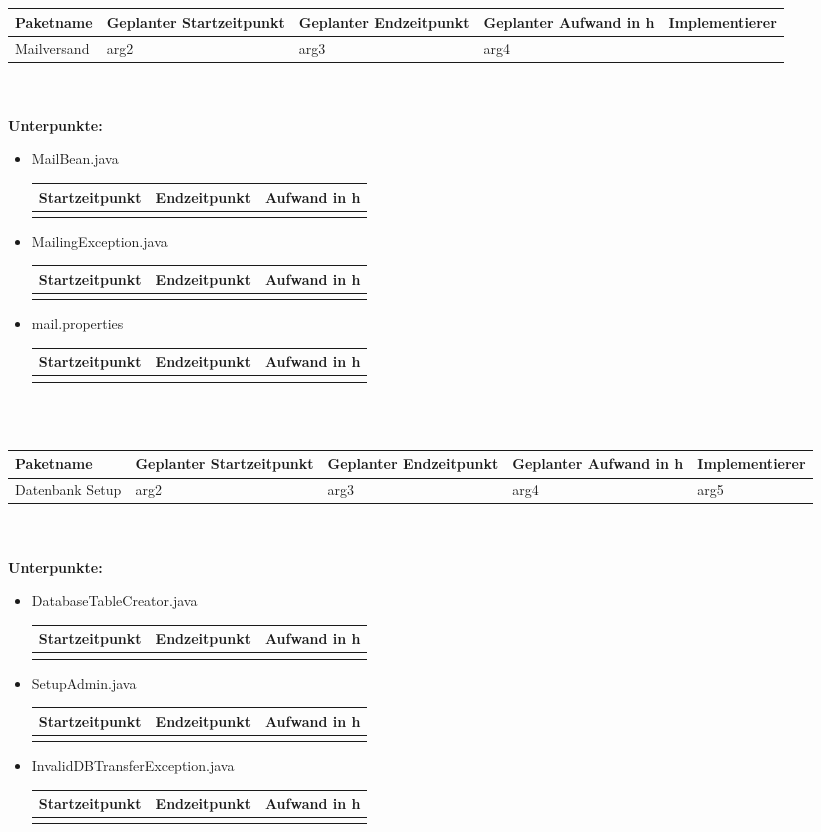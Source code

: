 \documentclass[12pt,a4paper]{scrreprt}
\newcommand{\Arbeitspaket}[5]{	\begin{tabular}{|p{4cm}|p{3cm}|p{3cm}|p{3cm}|p{3cm}|}
		\hline \textbf{Paketname} & \textbf{Geplanter Startzeitpunkt} & \textbf{Geplanter Endzeitpunkt} & \textbf{Geplanter Aufwand in h} & \textbf{Implementierer} \\ 
		\hline #1 & #2  & #3 & #4 & #5 \\ 
		\hline 
	\end{tabular} \ \\
	\ \\}
\begin{document}
	\ \\
	\ \\
	\Arbeitspaket{Mailversand}{arg2}{arg3}{arg4}{}
	\textbf{Unterpunkte:}
	\begin{itemize}
		\item MailBean.java\\
		\begin{tabular}{|p{4cm}|p{4cm}|p{4cm}|}
			\hline Startzeitpunkt & Endzeitpunkt & Aufwand in h \\ 
			\hline &      &  \\ 
			\hline 
		\end{tabular}
		\item MailingException.java	\\
		\begin{tabular}{|p{4cm}|p{4cm}|p{4cm}|}
			\hline Startzeitpunkt & Endzeitpunkt & Aufwand in h \\ 
			\hline &      &  \\ 
			\hline 
		\end{tabular}
		\item mail.properties\\
		\begin{tabular}{|p{4cm}|p{4cm}|p{4cm}|}
			\hline Startzeitpunkt & Endzeitpunkt & Aufwand in h \\ 
			\hline &      &  \\ 
			\hline 
		\end{tabular}
	\end{itemize}
		
	\ \\
	\ \\
	\Arbeitspaket{Datenbank Setup}{arg2}{arg3}{arg4}{arg5}
	\textbf{Unterpunkte:}
	\begin{itemize}
		\item DatabaseTableCreator.java\\
		\begin{tabular}{|p{4cm}|p{4cm}|p{4cm}|}
			\hline Startzeitpunkt & Endzeitpunkt & Aufwand in h \\ 
			\hline &      &  \\ 
			\hline 
		\end{tabular}
		\item SetupAdmin.java\\
		\begin{tabular}{|p{4cm}|p{4cm}|p{4cm}|}
			\hline Startzeitpunkt & Endzeitpunkt & Aufwand in h \\ 
			\hline &      &  \\ 
			\hline 
		\end{tabular}
		\item InvalidDBTransferException.java\\
		\begin{tabular}{|p{4cm}|p{4cm}|p{4cm}|}
			\hline Startzeitpunkt & Endzeitpunkt & Aufwand in h \\ 
			\hline &      &  \\ 
			\hline 
		\end{tabular}
	\end{itemize}
		
\end{document}
